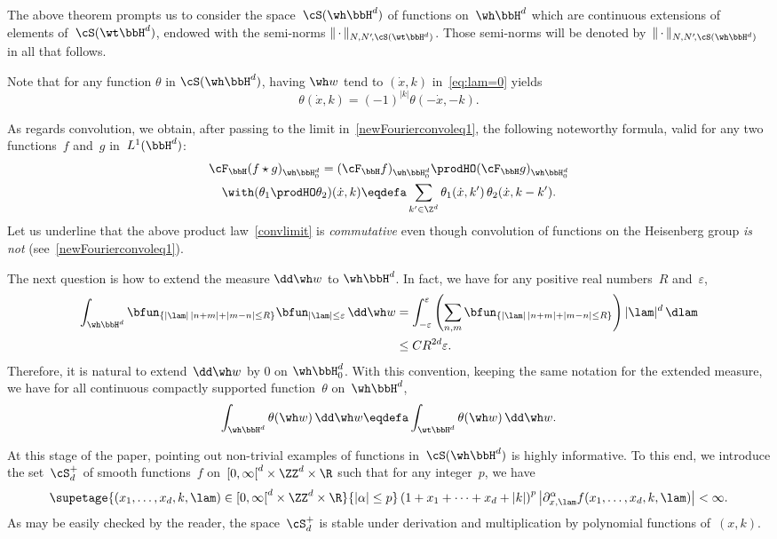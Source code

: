 The above theorem prompts us to consider the space~$\cS(\wh\bbH^d)$ of functions on~$\wh\bbH^d$ which are continuous extensions of elements of~$\cS(\wt \bbH^d)$, endowed with the semi-norms $\|{\,\cdot\,}\|_{N,N'\!,\cS(\wt \bbH^d)}$. Those semi-norms will be denoted by~$\|{\,\cdot\,}\|_{N,N'\!,\cS(\wh \bbH^d)}$ in all that follows.

Note that for any function $\theta$ in $\cS(\wh\bbH^d)$, having $\wh w$ tend to $(\dot x,k)$ in~\eqref{eq:lam=0} yields
\[
\theta(\dot x,k)=(-1)^{|k|}\theta(-\dot x,-k).
\]

As regards convolution, we obtain, after passing to the limit in~\eqref{newFourierconvoleq1}, the following noteworthy formula, valid for any two functions~$f$ and~$g$ in~$L^1(\bbH^d)$:
\begin{multline}\label{convlimit}
\cF_\bbH(f\star g)_{\wh\bbH^d_0} =(\cF_\bbH f)_{\wh\bbH^d_0}\prodHO (\cF_\bbH g)_{\wh\bbH^d_0}\\
\with (\theta_1\prodHO \theta_2)(\dot x,k) \eqdefa \sum_{k'\in\Z^d} \theta_1(\dot x,k')\, \theta_2(\dot x,k-k').
\end{multline}
Let us underline that the above product law~\eqref{convlimit} is \emph{commutative} even though convolution of functions on the Heisenberg group \emph{is not} (see~\eqref{newFourierconvoleq1}).

The next question is how to extend the measure $\dd\wh w$ to $\wh\bbH^d$. In fact, we have for any positive real numbers~$R$ and~$\varepsilon$,
\[
\begin{aligned}
\int_{\wh \bbH^d} \bfun_{\{|\lam|\,|n+m|+|m-n|\leq R\}} \bfun _{|\lam|\leq \varepsilon} \,\dd\wh w & =
\int_{-\varepsilon} ^\varepsilon \left(\sum_{n,m} \bfun_{\{|\lam|\,|n+m|+|m-n|\leq R\}}\right) |\lam|^d \,\dlam\\
&\leq CR^{2d}\varepsilon.
\end{aligned}
\]
Therefore, it is natural to extend~$\dd\wh w$ by $0$ on $\wh\bbH^d_0$. With this convention, keeping the same notation for the extended measure, we have for all continuous compactly supported function~$\theta$ on~$\wh\bbH^d$,
\[
\int_{\wh \bbH^d} \theta (\wh w)\,\dd\wh w \eqdefa \int_{\wt \bbH^d} \theta (\wh w)\,\dd\wh w.
\]

At this stage of the paper, pointing out non-trivial examples of functions in~$\cS(\wh \bbH^d)$ is highly informative. To this end, we introduce the set~$\cS^+_d$ of smooth functions~$f$ on~$[0,\infty\mathclose{[}^d\times \ZZ^d\times\R$ such that for any integer~$p$, we have
\[
\supetage{(x_1,\dots,x_d,k,\lam) \in [0,\infty\mathclose{[}^d\times\ZZ^d\times\R}{|\alpha|\leq p} \left(1+ x_1+\dots +x_d+|k|\right)^p
\left |\partial^\alpha_{x,\lam} f (x_1,\dots,x_d,k,\lam)\right|<\infty.
\]
As may be easily checked by the reader, the space~$\cS^+_d$ is stable under derivation and multiplication by polynomial functions of~$(x,k)$.


